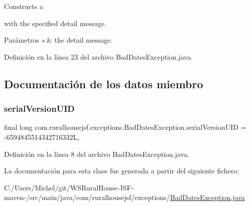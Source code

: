 Constructs a
\begin{DoxyCode}{0}
\end{DoxyCode}
 with the specified detail message.


\begin{DoxyParams}{Parámetros}
{\em s} & the detail message. \\
\hline
\end{DoxyParams}


Definición en la línea 23 del archivo Bad\+Dates\+Exception.\+java.



\subsection{Documentación de los datos miembro}
\mbox{\label{classcom_1_1ruralhousejsf_1_1exceptions_1_1_bad_dates_exception_a455e5569f117b53852ac14206bb2177f}} 
\subsubsection{\texorpdfstring{serialVersionUID}{serialVersionUID}}
{\footnotesize\ttfamily final long com.\+ruralhousejsf.\+exceptions.\+Bad\+Dates\+Exception.\+serial\+Version\+U\+ID = -\/6594845514342716332L\hspace{0.3cm}{\ttfamily [static]}, {\ttfamily [private]}}



Definición en la línea 8 del archivo Bad\+Dates\+Exception.\+java.



La documentación para esta clase fue generada a partir del siguiente fichero\+:\begin{DoxyCompactItemize}
\item 
C\+:/\+Users/\+Michel/git/\+W\+S\+Rural\+House-\/\+J\+S\+F-\/maven-\//src/main/java/com/ruralhousejsf/exceptions/\mbox{\hyperlink{_bad_dates_exception_8java}{Bad\+Dates\+Exception.\+java}}\end{DoxyCompactItemize}
